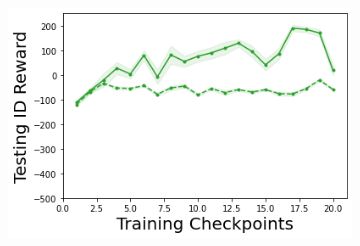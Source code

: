 \begin{figure}
\begin{subfigure}{.24\textwidth}
    \end{subfigure}
    \begin{subfigure}{.24\textwidth}
        \includegraphics[width=\textwidth]{sections/011_icml2022/resources/PostNet-LunarLander-v2-mean_reward_-testing-strategy.png}
    \end{subfigure}
    

\end{figure}
